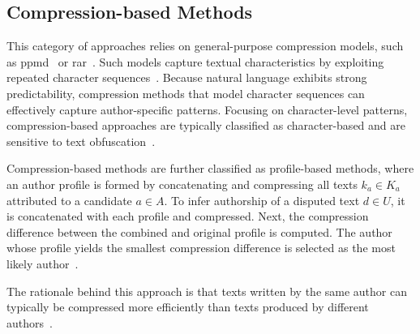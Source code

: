 \subsection{Compression-based Methods}
\label{subsec:compression_based}

This category of approaches relies on general-purpose compression models, such as \ac{ppmd}~\citep{ppm_2001} or \ac{rar}~\citep{rar_2004}. %
Such models capture textual characteristics by exploiting repeated character sequences~\citep{stamatatos_survey_2009,neal_surveying_2018}. 
Because natural language exhibits strong predictability, compression methods that model character sequences can effectively capture author-specific patterns.
Focusing on character-level patterns, compression-based approaches are typically classified as character-based and are sensitive to text obfuscation~\citep{bevendorff_divergence_based_2020}.

Compression-based methods are further classified as profile-based methods, where an author profile is formed by concatenating and compressing all texts $k_a \in K_a$ attributed to a candidate $a \in A$. 
To infer authorship of a disputed text $d \in U$, it is concatenated with each profile and compressed. 
Next, the compression difference between the combined and original profile is computed. 
The author whose profile yields the smallest compression difference is selected as the most likely author~\citep{stamatatos_survey_2009,elmanarelbouanani_authorship_2014,neal_surveying_2018}.

The rationale behind this approach is that texts written by the same author can typically be compressed more efficiently than texts produced by different authors~\citep{stamatatos_survey_2009,elmanarelbouanani_authorship_2014}.


